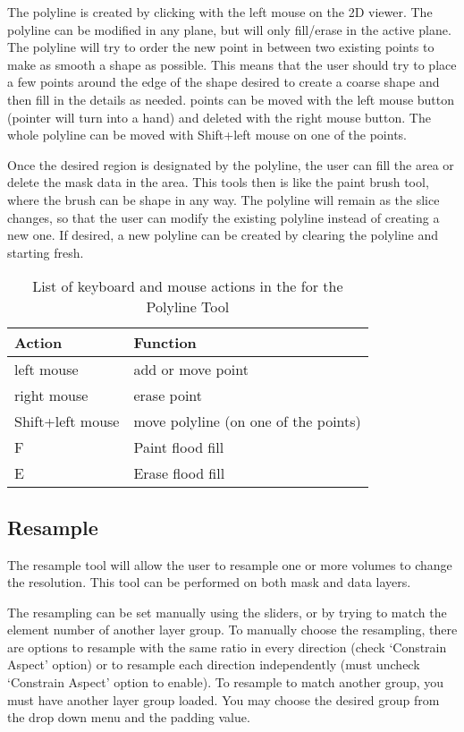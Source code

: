 \documentclass[fleqn,11pt,openany]{book}
\begin{document}
The polyline is created by clicking with the left mouse on the 2D viewer.  The polyline can be modified in any plane, but will only fill/erase in the active plane.   The polyline will try to order the new point in between two existing points to make as smooth a shape as possible.  This means that the user should try to place a few points around the edge of the shape desired to create a coarse shape and then fill in the details as needed.  points can be moved with the left mouse button (pointer will turn into a hand) and deleted with the right mouse button.  The whole polyline can be moved with Shift+left mouse on one of the points.  

Once the desired region is designated by the polyline, the user can fill the area or delete the mask data in the area.  This tools then is like the paint brush tool, where the brush can be shape in any way.  The polyline will remain as the slice changes, so that the user can modify the existing polyline instead of creating a new one.  If desired, a new polyline can be created by clearing the polyline and starting fresh.  


\begin{table}[h!]
\label{tab:polylinekey}
\caption{List of keyboard and mouse actions in the for the Polyline Tool}
\begin{tabular}{|l|l|}
\hline
{\bf Action} & {\bf Function}\\
\hline 
left mouse & add or move point \\
\hline
right mouse & erase point\\
\hline
Shift+left mouse & move polyline (on one of the points)\\
\hline
F & Paint flood fill\\
\hline
E & Erase flood fill\\ 
\hline
\end{tabular}
\end{table}

\subsection{Resample}

The resample tool will allow the user to resample one or more volumes to change the resolution. This tool can be performed on both mask and data layers.

The resampling can be set manually using the sliders, or by trying to match the element number of another layer group. To manually choose the resampling, there are options to resample with the same ratio in every direction (check `Constrain Aspect' option) or to resample each direction independently (must uncheck `Constrain Aspect' option to enable). To resample to match another group, you must have another layer group loaded. You may choose the desired group from the drop down menu and the padding value.
\end{document}
